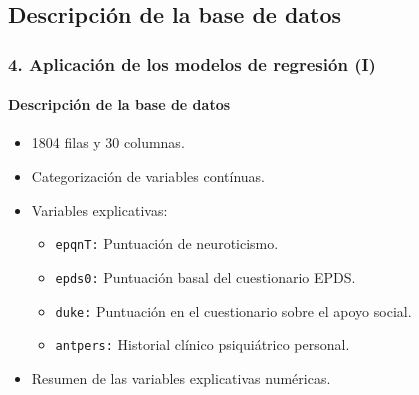 \documentclass{beamer}
\begin{document}
\subsection{Descripción de la base de datos}
\begin{frame}[fragile]
\frametitle{4. Aplicación de los modelos de regresión (I)}
\framesubtitle{Descripción de la base de datos}
\vspace{-0.1cm}
 	\begin{itemize}\itemsep6pt
 		\item 1804 filas y 30 columnas.
 		\item Categorización de variables contínuas.
 		\item Variables explicativas:
 				\begin{itemize}\itemsep2pt
 				\item \texttt{epqnT:} Puntuación de neuroticismo.
 				\item \texttt{epds0:} Puntuación basal del cuestionario EPDS.
 				\item \texttt{duke:} Puntuación en el cuestionario sobre el apoyo social.
 				\item \texttt{antpers:} Historial clínico psiquiátrico personal.
 			\end{itemize}
 		\item Resumen de las variables explicativas numéricas.
 	\end{itemize}
  \vspace{-0.4cm}
\begin{scriptsize}
 \begin{table} [h!]
 	\centering
 \end{table}
\end{scriptsize}
\end{frame}
\end{document}
